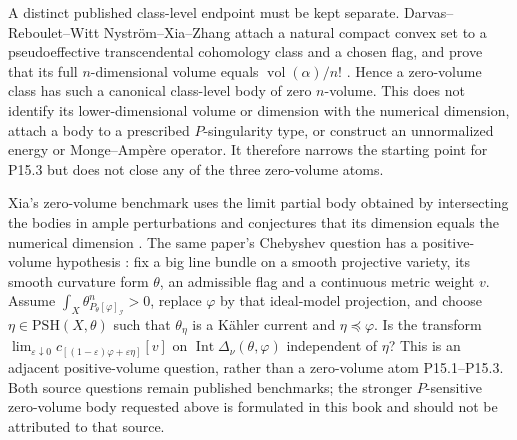 \documentclass[11pt,a4paper]{article}
\theoremstyle{definition}
\theoremstyle{remark}
\newcommand{\PSH}{\mathrm{PSH}}
\begin{document}
A distinct published class-level endpoint must be kept separate.
Darvas--Reboulet--Witt Nystr\"om--Xia--Zhang attach a natural compact
convex set to a pseudoeffective transcendental cohomology class and a
chosen flag, and prove that its full \(n\)-dimensional volume equals
\(\operatorname{vol}(\alpha)/n!\) \cite[pp.~135--136]{DRWNXZ}.  Hence a
zero-volume class has such a canonical class-level body of zero
\(n\)-volume.  This does not identify its lower-dimensional volume or
dimension with the numerical dimension, attach a body to a prescribed
\(P\)-singularity type, or construct an unnormalized energy or
Monge--Amp\`ere operator.  It therefore narrows the starting point for
P15.3 but does not close any of the three zero-volume atoms.

Xia's zero-volume benchmark uses the limit partial body obtained by
intersecting the bodies in ample perturbations and conjectures that its
dimension equals the numerical dimension
\cite[Section~5.6 and Conjecture~5.29]{Xia21}.
The same paper's Chebyshev question has a positive-volume hypothesis
\cite[Section~6.4, p.~1325]{Xia21}: fix a big line bundle on a smooth
projective variety, its smooth curvature form \(\theta\), an admissible
flag and a continuous metric weight \(v\).  Assume
\(\int_X\theta_{P_\theta[\varphi]_{\mathcal I}}^n>0\), replace
\(\varphi\) by that ideal-model projection, and choose
\(\eta\in\PSH(X,\theta)\) such that \(\theta_\eta\) is a K\"ahler
current and \(\eta\preceq\varphi\).  Is the transform
\(\lim_{\varepsilon\downarrow0}
c_{[(1-\varepsilon)\varphi+\varepsilon\eta]}[v]\)
on \(\operatorname{Int}\Delta_\nu(\theta,\varphi)\) independent of
\(\eta\)?  This is an adjacent positive-volume question, rather than a
zero-volume atom P15.1--P15.3.  Both source questions remain published
benchmarks; the stronger \(P\)-sensitive zero-volume body requested above
is formulated in this book and should not be attributed to that source.
\end{document}
